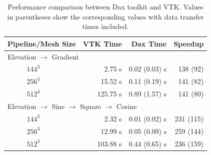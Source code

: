 \documentclass{vgtc}                          %
\begin{document}
\begin{table}[htbp]
  \centering
  \caption{Performance comparison between Dax toolkit and VTK. Values in
    parentheses show the corresponding values with data transfer times
    included.}
  \label{tab:Results}
  \vspace{6pt}
  \begin{tabular}{llrrr}
    \multicolumn{2}{l}{Pipeline/Mesh Size} & VTK Time & Dax Time & Speedup \\
    \hline
    \multicolumn{5}{l}{Elevation $\rightarrow$ Gradient} \\
    \qquad
    & $144^3$ & 2.75 s & 0.02 (0.03) s & 138 (92) \\
    & $256^3$ &  15.52 s & 0.11 (0.19) s & 141 (82) \\
    & $512^3$ &  125.75 s & 0.89 (1.57) s &  141 (80) \\
    \multicolumn{5}{l}{Elevation $\rightarrow$ Sine $\rightarrow$ Square $\rightarrow$ Cosine} \\
    & $144^3$ & 2.32 s & 0.01 (0.02) s &  231 (115) \\
    & $256^3$ &  12.99 s & 0.05 (0.09) s & 259 (144) \\
    & $512^3$ & 103.88 s & 0.44 (0.65) s &  236 (159) \\
  \end{tabular}
\end{table}
\end{document}
